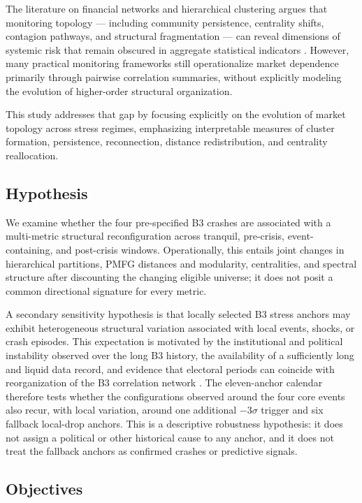 \documentclass[a4paper,fleqn,review]{cas-sc}
\begin{document}
The literature on financial networks and hierarchical clustering argues that monitoring topology --- including community persistence, centrality shifts, contagion pathways, and structural fragmentation --- can reveal dimensions of systemic risk that remain obscured in aggregate statistical indicators \citep{musmeci2017bootstrapping,bardoscia2017pathways}. However, many practical monitoring frameworks still operationalize market dependence primarily through pairwise correlation summaries, without explicitly modeling the evolution of higher-order structural organization.

This study addresses that gap by focusing explicitly on the evolution of market topology across stress regimes, emphasizing interpretable measures of cluster formation, persistence, reconnection, distance redistribution, and centrality reallocation.

\subsection{Hypothesis}

We examine whether the four pre-specified B3 crashes are associated with a multi-metric structural reconfiguration across tranquil, pre-crisis, event-containing, and post-crisis windows. Operationally, this entails joint changes in hierarchical partitions, PMFG distances and modularity, centralities, and spectral structure after discounting the changing eligible universe; it does not posit a common directional signature for every metric.

A secondary sensitivity hypothesis is that locally selected B3 stress anchors may exhibit heterogeneous structural variation associated with local events, shocks, or crash episodes. This expectation is motivated by the institutional and political instability observed over the long B3 history, the availability of a sufficiently long and liquid data record, and evidence that electoral periods can coincide with reorganization of the B3 correlation network \citep{cardoso2022electoral}. The eleven-anchor calendar therefore tests whether the configurations observed around the four core events also recur, with local variation, around one additional $-3\sigma$ trigger and six fallback local-drop anchors. This is a descriptive robustness hypothesis: it does not assign a political or other historical cause to any anchor, and it does not treat the fallback anchors as confirmed crashes or predictive signals.

\subsection{Objectives}
\end{document}
